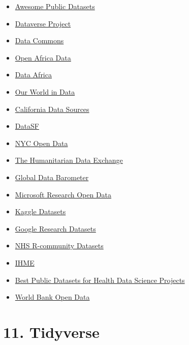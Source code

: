 \documentclass[
  letterpaper,
  DIV=11,
  numbers=noendperiod]{scrreprt}
\providecommand{\tightlist}{%
  \setlength{\itemsep}{0pt}\setlength{\parskip}{0pt}}\usepackage{longtable,booktabs,array}
\begin{document}

\begin{itemize}
\tightlist
\item
  \href{https://github.com/awesomedata/awesome-public-datasets}{Awesome
  Public Datasets}
\item
  \href{https://dataverse.org/}{Dataverse Project}
\item
  \href{https://datacommons.org/}{Data Commons}
\item
  \href{https://africaopendata.org/}{Open Africa Data}
\item
  \href{https://dataafrica.io/}{Data Africa}
\item
  \href{https://ourworldindata.org/}{Our World in Data}
\item
  \href{https://hillcrestadvisory.com/2019/01/20/california-data-sources/}{California
  Data Sources}
\item
  \href{https://datasf.org/opendata/}{DataSF}
\item
  \href{https://opendata.cityofnewyork.us/}{NYC Open Data}
\item
  \href{https://data.humdata.org/}{The Humanitarian Data Exchange}
\item
  \href{https://globaldatabarometer.org/}{Global Data Barometer}
\item
  \href{https://msropendata.com/}{Microsoft Research Open Data}
\item
  \href{https://www.kaggle.com/datasets}{Kaggle Datasets}
\item
  \href{https://datasetsearch.research.google.com/}{Google Research
  Datasets}
\item
  \href{https://nhs-r-community.github.io/NHSRdatasets/}{NHS R-community
  Datasets}
\item
  \href{https://www.healthdata.org/}{IHME}
\item
  \href{https://healthdatascience.substack.com/p/best-public-datasets-for-public-health-225}{Best
  Public Datasets for Health Data Science Projects}
\item
  \href{https://data.worldbank.org/}{World Bank Open Data}
\end{itemize}

\hypertarget{tidyverse}{%
\section*{11. Tidyverse}\label{tidyverse}}

\end{document}
